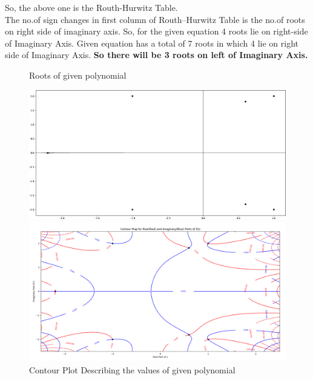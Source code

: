 So, the above one is the Routh-Hurwitz Table.\\
The no.of sign changes in first column of Routh–Hurwitz Table is the no.of roots on right side of imaginary axis.
So, for the given equation 4 roots lie on right-side of Imaginary Axis.
Given equation has a total of 7 roots in which 4 lie on right side of Imaginary Axis. \textbf{So there will be 3 roots on left of Imaginary Axis.}

\begin{figure}
    \caption{Roots of given polynomial}
    \includegraphics[scale=0.15]{figs/Roots.eps}
    
    \caption{Contour Plot Describing the values of given polynomial}
    \includegraphics[scale=0.15]{figs/f(z).png}
\end{figure}
